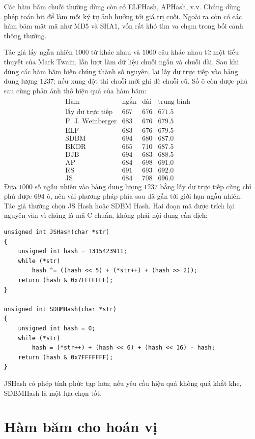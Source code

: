 \documentclass[11pt]{article}
\begin{document}
Các hàm băm chuỗi thường dùng còn có ELFHash, APHash, v.v. Chúng dùng phép
toán bit để làm mỗi ký tự ảnh hưởng tới giá trị cuối. Ngoài ra còn có các hàm
băm mật mã như MD5 và SHA1, vốn rất khó tìm va chạm trong bối cảnh thông
thường.

Tác giả lấy ngẫu nhiên $1000$ từ khác nhau và $1000$ câu khác nhau từ một tiểu
thuyết của Mark Twain, lần lượt làm dữ liệu chuỗi ngắn và chuỗi dài. Sau khi
dùng các hàm băm biến chúng thành số nguyên, lại lấy dư trực tiếp vào bảng
dung lượng $1237$; nếu xung đột thì chuỗi mới ghi đè chuỗi cũ. Số ô còn được
phủ sau cùng phản ánh thô hiệu quả của hàm băm:
\[
\begin{array}{lrrr}
\text{Hàm} & \text{ngắn} & \text{dài} & \text{trung bình}\\
\hline
\text{lấy dư trực tiếp} & 667 & 676 & 671.5\\
\text{P. J. Weinberger} & 683 & 676 & 679.5\\
\text{ELF} & 683 & 676 & 679.5\\
\text{SDBM} & 694 & 680 & 687.0\\
\text{BKDR} & 665 & 710 & 687.5\\
\text{DJB} & 694 & 683 & 688.5\\
\text{AP} & 684 & 698 & 691.0\\
\text{RS} & 691 & 693 & 692.0\\
\text{JS} & 684 & 708 & 696.0
\end{array}
\]
Đưa $1000$ số ngẫu nhiên vào bảng dung lượng $1237$ bằng lấy dư trực tiếp cũng
chỉ phủ được $694$ ô, nên vài phương pháp phía sau đã gần tới giới hạn ngẫu
nhiên. Tác giả thường chọn JS Hash hoặc SDBM Hash. Hai đoạn mã được trích lại
nguyên văn vì chúng là mã C chuẩn, không phải nội dung cần dịch:

\begin{verbatim}
unsigned int JSHash(char *str)
{
    unsigned int hash = 1315423911;
    while (*str)
        hash ^= ((hash << 5) + (*str++) + (hash >> 2));
    return (hash & 0x7FFFFFFF);
}

unsigned int SDBMHash(char *str)
{
    unsigned int hash = 0;
    while (*str)
        hash = (*str++) + (hash << 6) + (hash << 16) - hash;
    return (hash & 0x7FFFFFFF);
}
\end{verbatim}

JSHash có phép tính phức tạp hơn; nếu yêu cầu hiệu quả không quá khắt khe,
SDBMHash là một lựa chọn tốt.

\section{Hàm băm cho hoán vị}
\end{document}
